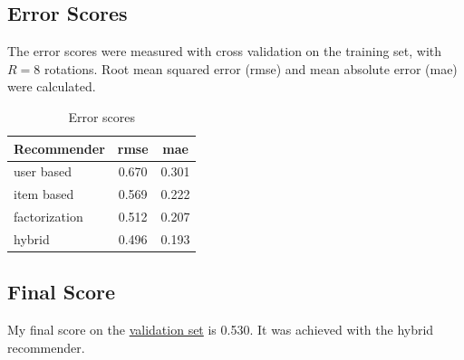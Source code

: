 \documentclass[11pt]{scrartcl}
\begin{document}
\subsection{Error Scores}
The error scores were measured with cross validation on the training set, with $R = 8$ rotations.
Root mean squared error (rmse) and mean absolute error (mae) were calculated.
\begin{table}[!htb]
	\centering
	\begin{tabular}{|l|c|c|}
		\hline
		Recommender   & rmse  & mae   \\\hline\hline
		user based    & 0.670 & 0.301 \\\hline
		item based    & 0.569 & 0.222 \\\hline
		factorization & 0.512 & 0.207 \\\hline
		hybrid        & 0.496 & 0.193 \\\hline
	\end{tabular}
	\caption{Error scores}\label{tab:errors}
\end{table}
\subsection{Final Score}
My final score on the \href{http://csujena.pythonanywhere.com/}{validation set} is 0.530.
It was achieved with the hybrid recommender.


% 
% 
\end{document}
